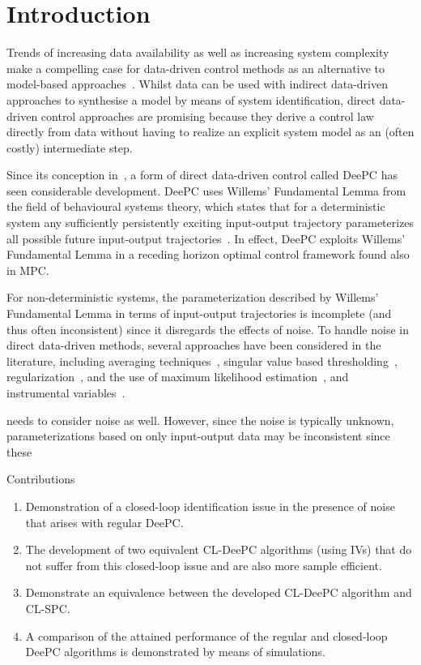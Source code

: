 \section{Introduction}
Trends of increasing data availability as well as increasing system complexity make a compelling case for data-driven control methods as an alternative to model-based approaches~\cite{Hou2013}. Whilst data can be used with indirect data-driven approaches to synthesise a model by means of system identification, direct data-driven control approaches are promising because they derive a control law directly from data without having to realize an explicit system model as an (often costly) intermediate step.

Since its conception in~\cite{Coulson2019}, a form of direct data-driven control called \ac{DeePC} has seen considerable development. \ac{DeePC} uses Willems' Fundamental Lemma from the field of behavioural systems theory, which states that for a deterministic system any sufficiently persistently exciting input-output trajectory parameterizes all possible future input-output trajectories~\cite{Willems2005}. In effect, \ac{DeePC} exploits Willems' Fundamental Lemma in a receding horizon optimal control framework found also in \ac{MPC}.

For non-deterministic systems, the parameterization described by Willems' Fundamental Lemma in terms of input-output trajectories is incomplete (and thus often inconsistent) since it disregards the effects of noise. To handle noise in direct data-driven methods, several approaches have been considered in the literature, including averaging techniques~\cite{Jo2022}, singular value based thresholding~\cite{Sassella2022}, regularization~\cite{Coulson2019}, and the use of maximum likelihood estimation~\cite{Yin2023}, and instrumental variables~\cite{vanWingerden2022}.

needs to consider noise as well. However, since the noise is typically unknown, parameterizations based on only input-output data may be inconsistent since these


Contributions
\begin{enumerate}
\item Demonstration of a closed-loop identification issue in the presence of noise that arises with regular \ac{DeePC}.
\item The development of two equivalent \ac{CL-DeePC} algorithms (using \ac{IVs}) that do not suffer from this closed-loop issue and are also more sample efficient.
\item Demonstrate an equivalence between the developed \ac{CL-DeePC} algorithm and \ac{CL-SPC}.
\item A comparison of the attained performance of the regular and closed-loop \ac{DeePC} algorithms is demonstrated by means of simulations.
\end{enumerate}